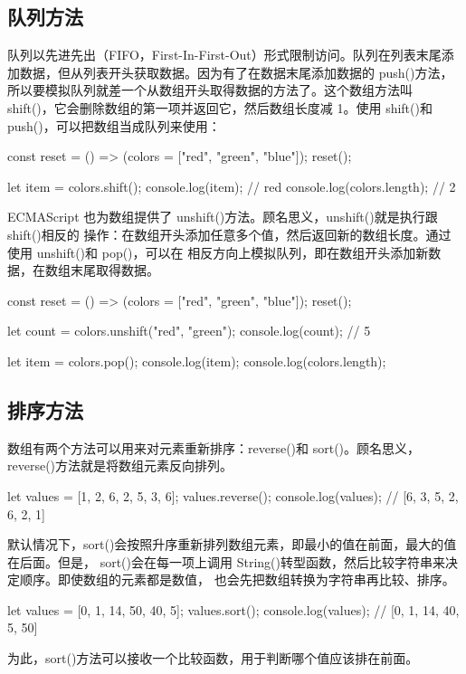 \subsection{队列方法}
队列以先进先出（FIFO，First-In-First-Out）形式限制访问。队列在列表末尾添加数据，但从列表开头获取数据。因为有了在数据末尾添加数据的 push()方法，所以要模拟队列就差一个从数组开头取得数据的方法了。这个数组方法叫 shift()，它会删除数组的第一项并返回它，然后数组长度减 1。使用 shift()和 push()，可以把数组当成队列来使用：

\begin{js}
const reset = () => (colors = ["red", "green", "blue"]);
reset();

let item = colors.shift();
console.log(item); // red
console.log(colors.length); // 2
\end{js}

ECMAScript 也为数组提供了 unshift()方法。顾名思义，unshift()就是执行跟 shift()相反的
操作：在数组开头添加任意多个值，然后返回新的数组长度。通过使用 unshift()和 pop()，可以在
相反方向上模拟队列，即在数组开头添加新数据，在数组末尾取得数据。

\begin{js}
const reset = () => (colors = ["red", "green", "blue"]);
reset();

let count = colors.unshift("red", "green");
console.log(count); // 5

let item = colors.pop();
console.log(item);
console.log(colors.length);
\end{js}
\subsection{排序方法}
数组有两个方法可以用来对元素重新排序：reverse()和 sort()。顾名思义，reverse()方法就是将数组元素反向排列。
\begin{js}
let values = [1, 2, 6, 2, 5, 3, 6];
values.reverse();
console.log(values); // [6, 3, 5, 2, 6, 2, 1]
\end{js}

默认情况下，sort()会按照升序重新排列数组元素，即最小的值在前面，最大的值在后面。但是，
sort()会在每一项上调用 String()转型函数，然后比较字符串来决定顺序。即使数组的元素都是数值，
也会先把数组转换为字符串再比较、排序。

\begin{js}
let values = [0, 1, 14, 50, 40, 5];
values.sort();
console.log(values); // [0, 1, 14, 40, 5, 50]
\end{js}

为此，sort()方法可以接收一个比较函数，用于判断哪个值应该排在前面。

